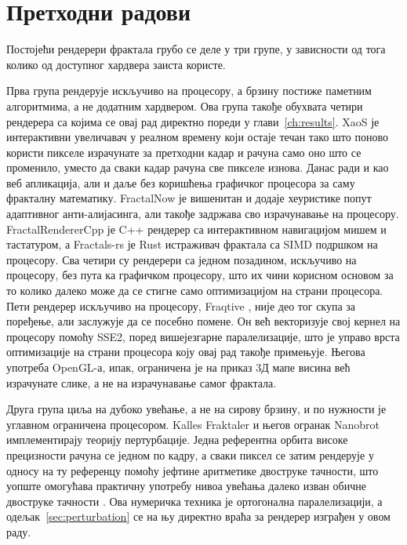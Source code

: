 \documentclass[serbian]{ftndiplomski}
\begin{document}
\section{Претходни радови}
\label{sec:related-work}

Постојећи рендерери фрактала грубо се деле у три групе, у зависности од тога колико од
доступног хардвера заиста користе.

Прва група рендерује искључиво на процесору, а брзину постиже паметним алгоритмима, а
не додатним хардвером. Ова група такође обухвата четири рендерера са којима се овај рад
директно пореди у глави~\ref{ch:results}. XaoS \cite{xaos2026} је интерактивни
увеличавач у реалном времену који остаје течан тако што поново користи пикселе
израчунате за претходни кадар и рачуна само оно што се променило, уместо да сваки кадар
рачуна све пикселе изнова. Данас ради и као веб апликација, али и даље без коришћења
графичког процесора за саму фракталну математику. FractalNow \cite{fractalnow2017} је
вишенитан и додаје хеуристике попут адаптивног анти-алијасинга, али такође задржава сво
израчунавање на процесору. FractalRendererCpp \cite{fractalrenderercpp2021} је C++
рендерер са интерактивном навигацијом мишем и тастатуром, а Fractals-rs
\cite{fractalsrs2026} је Rust истраживач фрактала са SIMD подршком на процесору. Сва
четири су рендерери са једном позадином, искључиво на процесору, без пута ка графичком
процесору, што их чини корисном основом за то колико далеко може да се стигне само
оптимизацијом на страни процесора. Пети рендерер искључиво на процесору, Fraqtive
\cite{fraqtive2023}, није део тог скупа за поређење, али заслужује да се посебно
помене. Он већ векторизује свој кернел на процесору помоћу SSE2, поред вишејезгарне
паралелизације, што је управо врста оптимизације на страни процесора коју овај рад
такође примењује. Његова употреба OpenGL-а, ипак, ограничена је на приказ 3Д мапе
висина већ израчунате слике, а не на израчунавање самог фрактала.

Друга група циља на дубоко увећање, а не на сирову брзину, и по нужности је углавном
ограничена процесором. Kalles Fraktaler и његов огранак Nanobrot \cite{nanobrot2020}
имплементирају теорију пертурбације. Једна референтна орбита високе прецизности рачуна
се једном по кадру, а сваки пиксел се затим рендерује у односу на ту референцу помоћу
јефтине аритметике двоструке тачности, што уопште омогућава практичну употребу нивоа
увећања далеко изван обичне двоструке тачности \cite{heilandallen2021deepzoom}. Ова
нумеричка техника је ортогонална паралелизацији, а одељак~\ref{sec:perturbation} се на
њу директно враћа за рендерер изграђен у овом раду.
\end{document}

